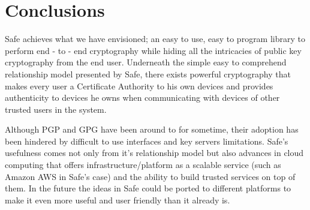 \section{Conclusions}
\label{sec:conclusion}
Safe achieves what we have envisioned; an easy to use, easy to program library to perform end - to - end cryptography while hiding all the intricacies of public key cryptography from the end user. Underneath the simple easy to comprehend relationship model presented by Safe, there exists powerful cryptography that makes every user a Certificate Authority to his own devices and provides authenticity to devices he owns when communicating with devices of other trusted users in the system. 

Although PGP and GPG have been around to for sometime, their adoption has been hindered by difficult to use interfaces and key servers limitations. Safe's usefulness comes not only from it's relationship model but also advances in cloud computing that offers infrastructure/platform as a scalable service (such as Amazon AWS in Safe's case) and the ability to build trusted services on top of them. In the future the ideas in Safe could be ported to different platforms to make it even more useful and user friendly than it already is.